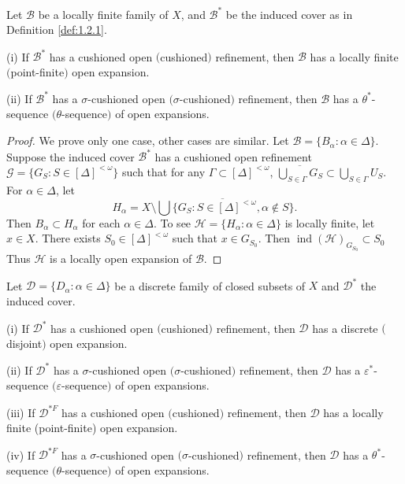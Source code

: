 \documentclass[prelim.tex]{subfiles}
\begin{document}
{\lemma{} \label{lem:1.2.3}
Let $\mathscr{B}$ be a locally finite family of $X$, 
and $\mathscr{B}^*$ be the induced cover as in Definition \ref*{def:1.2.1}.

\textup{(i)} If $\mathscr{B}^*$ has a cushioned open $($cushioned$)$ refinement, then $\mathscr{B}$ has a locally finite $($point-finite$)$ open expansion.

\textup{(ii)}  If $\mathscr{B}^*$ has a $\sigma$-cushioned open $(\sigma$-cushioned$)$ refinement, then $\mathscr{B}$ has a $\theta^*$-sequence $(\theta$-sequence$)$ 
of open expansions.
} %

\begin{proof} 
We prove only one case, other cases are
similar. Let $\mathscr{B} = \{B_\alpha: \alpha \in \Delta\}$. Suppose
the induced cover $\mathscr{B}^*$ %
has a cushioned open refinement
$\mathscr{G} = \{G_S: S\in [\Delta]^{<\omega}\}$ such that for any
$\Gamma\subset[\Delta]^{<\omega}$,
$\overline{\bigcup_{S\in\Gamma}G_S}\subset\bigcup_{S\in\Gamma}U_S$.
For $\alpha\in\Delta$, let
$$H_\alpha = X \setminus \overline{\bigcup\{G_S: S\in [\Delta]^{<\omega}, \alpha\notin S}\}.$$
Then $B_\alpha\subset H_\alpha$ for each $\alpha\in\Delta$.
To see $\mathscr{H}=\{H_\alpha: \alpha\in\Delta\}$
is locally finite, let $x \in X$. There exists $S_0 \in [\Delta]^{<\omega}$ such that 
$x \in G_{S_0}$.
Then $\operatorname{ind}(\mathscr{H})_{G_{S_0}}  \subset S_0$ Thus 
$\mathscr{H}$ is a locally open expansion
of $\mathscr{B}$.
\end{proof} 

{\lemma{} \label{lem:1.2.4}
Let $\mathscr{D} = \{D_\alpha: \alpha \in \Delta\}$ be a discrete family
of closed subsets of $X$ and $\mathscr{D}^*$ the induced cover.

\textup{(i)}  If $\mathscr{D}^*$ has a cushioned open $($cushioned$)$ refinement, 
then $\mathscr{D}$ has a discrete $($disjoint$)$ open expansion.

\textup{(ii)}  If $\mathscr{D}^*$ has a  $\sigma$-cushioned open 
$(\sigma$-cushioned$)$ 
 refinement, then $\mathscr{D}$ has a $\varepsilon^*$-sequence 
 $(\varepsilon$-sequence$)$ 
 of open expansions.

\textup{(iii)}  If $\mathscr{D}^{*F}$ has a cushioned open $($cushioned$)$ 
refinement, then $\mathscr{D}$ 
has a locally finite (point-finite) open expansion.

\textup{(iv)}  If $\mathscr{D}^{*F}$ has a $\sigma$-cushioned open 
$(\sigma$-cushioned$)$ 
refinement, then $\mathscr{D}$ has a $\theta^*$-sequence 
$(\theta$-sequence$)$ of open expansions.
}%
\end{document}

